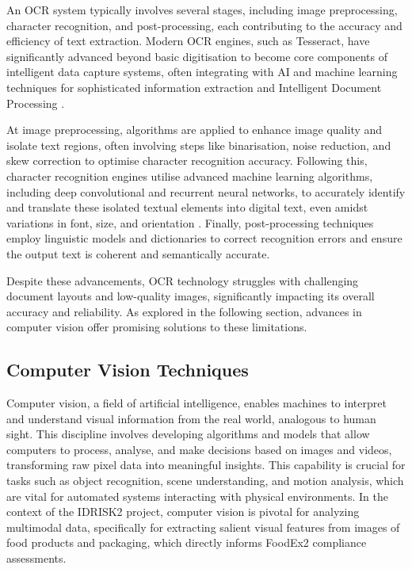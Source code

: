 An OCR system typically involves several stages, including image preprocessing, character recognition, and post-processing, each contributing to the accuracy and efficiency of text extraction. Modern OCR engines, such as Tesseract, have significantly advanced beyond basic digitisation to become core components of intelligent data capture systems, often integrating with AI and machine learning techniques for sophisticated information extraction and Intelligent Document Processing \parencite{munasprianto_ramli_8ac57418}.

At image preprocessing, algorithms are applied to enhance image quality and isolate text regions, often involving steps like binarisation, noise reduction, and skew correction to optimise character recognition accuracy. Following this, character recognition engines utilise advanced machine learning algorithms, including deep convolutional and recurrent neural networks, to accurately identify and translate these isolated textual elements into digital text, even amidst variations in font, size, and orientation \parencite{chih_chung_hsu_2d9c1cb7}. Finally, post-processing techniques employ linguistic models and dictionaries to correct recognition errors and ensure the output text is coherent and semantically accurate.

Despite these advancements, OCR technology struggles with challenging document layouts and low-quality images, significantly impacting its overall accuracy and reliability. As explored in the following section, advances in computer vision offer promising solutions to these limitations.

\hypertarget{computer-vision-techniques}{%
\subsection{Computer Vision Techniques}\label{computer-vision-techniques}}

Computer vision, a field of artificial intelligence, enables machines to interpret and understand visual information from the real world, analogous to human sight. This discipline involves developing algorithms and models that allow computers to process, analyse, and make decisions based on images and videos, transforming raw pixel data into meaningful insights. This capability is crucial for tasks such as object recognition, scene understanding, and motion analysis, which are vital for automated systems interacting with physical environments. In the context of the IDRISK2 project, computer vision is pivotal for analyzing multimodal data, specifically for extracting salient visual features from images of food products and packaging, which directly informs FoodEx2 compliance assessments.

